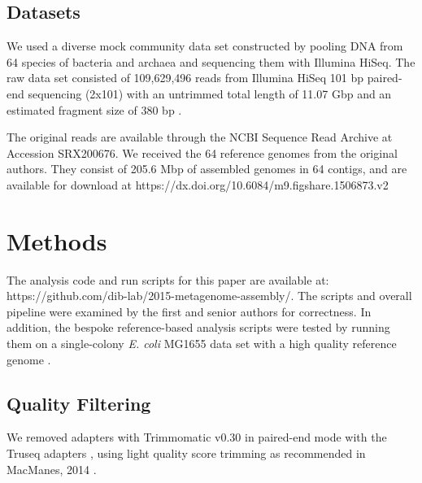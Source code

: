 \documentclass[10pt,a4paper,twocolumn]{article}
\begin{document}
 

\subsection*{Datasets}

We used a diverse mock community data set constructed by pooling DNA
from 64 species of bacteria and archaea and sequencing them with
Illumina HiSeq.  The raw data set consisted of 109,629,496 reads from
Illumina HiSeq 101 bp paired-end sequencing (2x101) with an untrimmed
total length of 11.07 Gbp and an estimated fragment size of 380 bp
\cite{podar}.
 
The original reads are available through the NCBI Sequence Read
Archive at Accession SRX200676.
We received the 64 reference genomes from the original authors. They
consist of 205.6 Mbp of assembled genomes in 64 contigs, and are
available for download at
https://dx.doi.org/10.6084/m9.figshare.1506873.v2

\section*{Methods}
The analysis code and run scripts for this paper are available at:
https://github.com/dib-lab/2015-metagenome-assembly/. The scripts and
overall pipeline were examined by the first and senior authors for
correctness.  In addition, the bespoke reference-based analysis
scripts were tested by running them on a single-colony {\em E. coli} MG1655
data set with a high quality reference genome \cite{chitsaz2011}.

\subsection*{Quality Filtering} 

We removed adapters with Trimmomatic v0.30 in paired-end mode with the
Truseq adapters \cite{trimmomatic}, using light quality score trimming
as recommended in MacManes, 2014 \cite{macmanes2014}.

\end{document}
